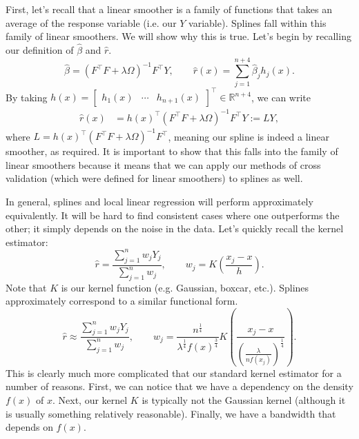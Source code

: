 
First, let's recall that a linear smoother is a family of functions that takes an average of the response variable (i.e. our $Y$ variable). Splines fall within this family of linear smoothers. We will show why this is true. Let's begin by recalling our definition of $\hat\beta$ and $\hat{r}$.
\begin{equation*}
    \hat\beta = (F^\top F + \lambda\Omega)^{-1} F^\top Y, \qquad \hat{r}(x) = \sum_{j=1}^{n+4} \hat\beta_jh_j(x).
\end{equation*}
By taking $h(x) = \begin{bmatrix} h_1(x) & \cdots & h_{n+1}(x) \end{bmatrix}^\top \in \mathbb{R}^{n+4}$, we can write
\begin{align*}
	\hat{r}(x) & = h(x)^\top  (F^\top F + \lambda\Omega)^{-1} F^\top Y := LY,
\end{align*}
where $L = h(x)^\top  (F^\top F + \lambda\Omega)^{-1} F^\top$, meaning our spline is indeed a linear smoother, as required. It is important to show that this falls into the family of linear smoothers because it means that we can apply our methods of cross validation (which were defined for linear smoothers) to splines as well.

In general, splines and local linear regression will perform approximately equivalently. It will be hard to find consistent cases where one outperforms the other; it simply depends on the noise in the data. Let's quickly recall the kernel estimator:
$$
\hat{r} = \frac{\sum_{j=1}^n w_jY_j}{\sum_{j=1}^n w_j}, \qquad w_j = K\left( \frac{x_j - x}{h} \right).
$$
Note that $K$ is our kernel function (e.g. Gaussian, boxcar, etc.). Splines approximately correspond to a similar functional form.
$$
\hat{r} \approx \frac{\sum_{j=1}^n w_jY_j}{\sum_{j=1}^n w_j}, \qquad w_j = \frac{n^{\frac{1}{4}}}{\lambda^{\frac{1}{4}}f(x)^{\frac{3}{4}}} K\left( \frac{x_j - x}{ \left( \frac{\lambda}{nf(x_j)} \right)^{\frac{1}{4}}} \right).
$$
This is clearly much more complicated that our standard kernel estimator for a number of reasons. First, we can notice that we have a dependency on the density $f(x)$ of $x$. Next, our kernel $K$ is typically not the Gaussian kernel (although it is usually something relatively reasonable). Finally, we have a bandwidth that depends on $f(x)$. 


